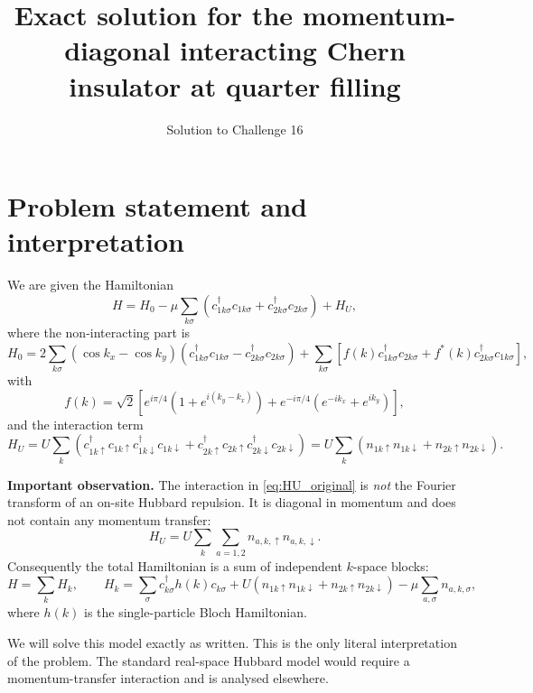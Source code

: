 \documentclass[11pt,a4paper]{article}
\title{Exact solution for the momentum-diagonal interacting Chern insulator at quarter filling}
\author{Solution to Challenge 16}
\date{}
\begin{document}
\maketitle

\section{Problem statement and interpretation}

We are given the Hamiltonian
\begin{equation}
\label{eq:Hfull}
H = H_0 - \mu \sum_{k\sigma}\left(c_{1k\sigma}^{\dagger}c_{1k\sigma}+c_{2k\sigma}^{\dagger}c_{2k\sigma}\right)
+ H_U,
\end{equation}
where the non-interacting part is
\begin{equation}
H_0 = 2\sum_{k\sigma}(\cos k_x-\cos k_y)
\left(c_{1k\sigma}^{\dagger}c_{1k\sigma}-c_{2k\sigma}^{\dagger}c_{2k\sigma}\right)
+ \sum_{k\sigma}\left[f(k)c_{1k\sigma}^{\dagger}c_{2k\sigma}+f^*(k)c_{2k\sigma}^{\dagger}c_{1k\sigma}\right],
\end{equation}
with
\begin{equation}
f(k)=\sqrt{2}\left[e^{i\pi/4}\left(1+e^{i(k_y-k_x)}\right)
+e^{-i\pi/4}\left(e^{-ik_x}+e^{ik_y}\right)\right],
\end{equation}
and the interaction term
\begin{equation}
\label{eq:HU_original}
H_U = U\sum_{k}\left(
c_{1k\uparrow}^{\dagger}c_{1k\uparrow}
c_{1k\downarrow}^{\dagger}c_{1k\downarrow}
+
c_{2k\uparrow}^{\dagger}c_{2k\uparrow}
c_{2k\downarrow}^{\dagger}c_{2k\downarrow}
\right)
= U\sum_k\left(n_{1k\uparrow}n_{1k\downarrow}+n_{2k\uparrow}n_{2k\downarrow}\right).
\end{equation}

\textbf{Important observation.}  
The interaction in \eqref{eq:HU_original} is \emph{not} the Fourier transform of an on-site Hubbard repulsion. It is diagonal in momentum and does not contain any momentum transfer:
\[
H_U = U\sum_k \sum_{a=1,2} n_{a,k,\uparrow} n_{a,k,\downarrow}.
\]
Consequently the total Hamiltonian is a sum of independent \(k\)-space blocks:
\begin{equation}
H = \sum_k H_k,
\qquad
H_k = \sum_{\sigma} c_{k\sigma}^{\dagger} h(k) c_{k\sigma}
+ U\left(n_{1k\uparrow}n_{1k\downarrow}+n_{2k\uparrow}n_{2k\downarrow}\right)
- \mu \sum_{a,\sigma} n_{a,k,\sigma},
\end{equation}
where \(h(k)\) is the single-particle Bloch Hamiltonian.

We will solve this model exactly as written. This is the only literal interpretation of the problem. The standard real-space Hubbard model would require a momentum-transfer interaction and is analysed elsewhere.
\end{document}
